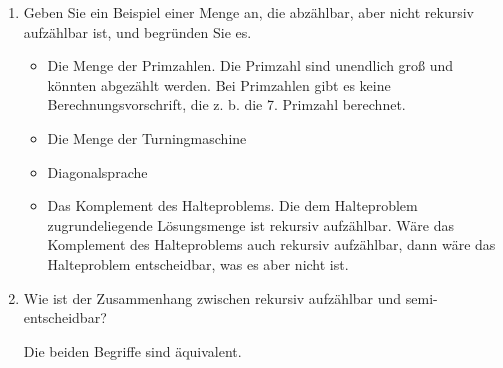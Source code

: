 \documentclass{lehramt-informatik-aufgabe}
\begin{document}
\begin{enumerate}


\item Geben Sie ein Beispiel einer Menge an, die abzählbar, aber nicht
rekursiv aufzählbar ist, und begründen Sie es.

\begin{liAntwort}
\begin{itemize}
\item Die Menge der Primzahlen. Die Primzahl sind unendlich groß und
könnten abgezählt werden. Bei Primzahlen gibt es keine
Berechnungsvorschrift, die z. b. die 7. Primzahl berechnet.

\item Die Menge der Turningmaschine

\item Diagonalsprache

\item Das Komplement des Halteproblems. Die dem Halteproblem
zugrundeliegende Lösungsmenge ist rekursiv aufzählbar. Wäre das
Komplement des Halteproblems auch rekursiv aufzählbar, dann wäre das
Halteproblem entscheidbar, was es aber nicht ist.
\end{itemize}
\end{liAntwort}


\item Wie ist der Zusammenhang zwischen rekursiv aufzählbar und
semi-entscheidbar?

\begin{liAntwort}
Die beiden Begriffe sind äquivalent.
\end{liAntwort}

\end{enumerate}
\end{document}
